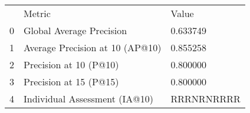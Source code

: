 \begin{tabular}{lll}
 & Metric & Value \\
0 & Global Average Precision & 0.633749 \\
1 & Average Precision at 10 (AP@10) & 0.855258 \\
2 & Precision at 10 (P@10) & 0.800000 \\
3 & Precision at 15 (P@15) & 0.800000 \\
4 & Individual Assessment (IA@10) & RRRNRNRRRR \\
\end{tabular}
